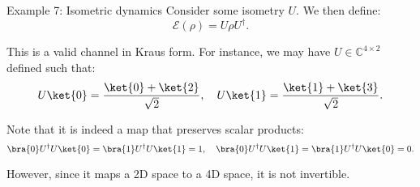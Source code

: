 \documentclass[a4paper]{article}
\begin{document}
\begin{parag}{Example 7: Isometric dynamics}
    Consider some isometry $U$. We then define: 
    \[\mathcal{E}\left(\rho\right) = U \rho U^{\dagger}.\]

    This is a valid channel in Kraus form. For instance, we may have $U \in \mathbb{C}^{4 \times 2}$ defined such that: 
    \[U \ket{0} = \frac{\ket{0} + \ket{2}}{\sqrt{2}}, \mathspace U \ket{1} = \frac{\ket{1} + \ket{3}}{\sqrt{2}}.\]

    Note that it is indeed a map that preserves scalar products:
    \[\bra{0} U^{\dagger} U \ket{0} = \bra{1} U^{\dagger} U \ket{1} = 1, \mathspace \bra{0} U^{\dagger} U \ket{1} = \bra{1} U^{\dagger} U \ket{0} = 0.\]

    However, since it maps a 2D space to a 4D space, it is not invertible.
\end{parag}
\end{document}
